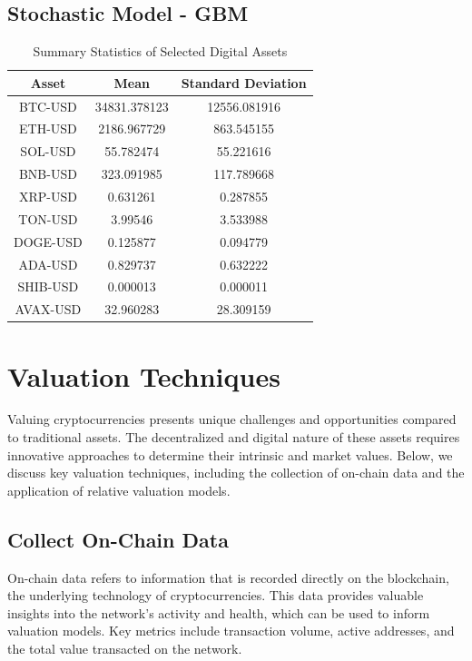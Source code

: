 \documentclass{ledger}
\begin{document}
\subsection{Stochastic Model - GBM}




\begin{table}
    \centering
    \begin{tabular}{ccc}
         \toprule
         \textbf{Asset} & \textbf{Mean} & \textbf{Standard Deviation} \\
         \midrule
         BTC-USD & 34831.378123 & 12556.081916 \\
         ETH-USD & 2186.967729 & 863.545155 \\
         SOL-USD & 55.782474 & 55.221616 \\
         BNB-USD & 323.091985 & 117.789668 \\
         XRP-USD & 0.631261 & 0.287855 \\
         TON-USD & 3.99546 & 3.533988 \\
         DOGE-USD & 0.125877 & 0.094779 \\
         ADA-USD & 0.829737 & 0.632222 \\
         SHIB-USD & 0.000013 & 0.000011 \\
         AVAX-USD & 32.960283 & 28.309159 \\
         \bottomrule
    \end{tabular}
    \caption{Summary Statistics of Selected Digital Assets}
    \label{tab:summary_stats}
\end{table}


\section{Valuation Techniques}

Valuing cryptocurrencies presents unique challenges and opportunities compared to traditional assets. The decentralized and digital nature of these assets requires innovative approaches to determine their intrinsic and market values. Below, we discuss key valuation techniques, including the collection of on-chain data and the application of relative valuation models.

\subsection{Collect On-Chain Data}

On-chain data refers to information that is recorded directly on the blockchain, the underlying technology of cryptocurrencies. This data provides valuable insights into the network's activity and health, which can be used to inform valuation models. Key metrics include transaction volume, active addresses, and the total value transacted on the network.
\end{document}

